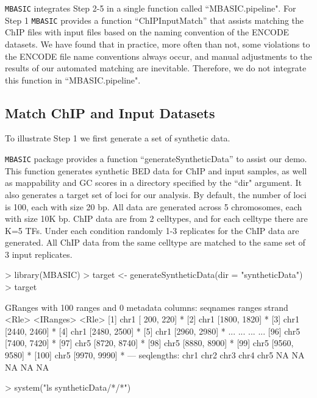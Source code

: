 \documentclass[a4paper,10pt]{article}
\begin{document}
\texttt{MBASIC} integrates Step 2-5 in a single function called ``MBASIC.pipeline". For Step 1 \texttt{MBASIC} provides a function ``ChIPInputMatch'' that assists matching the ChIP files with input files based on the naming convention of the ENCODE datasets. We have found that in practice, more often than not, some violations to the ENCODE file name conventions always occur, and manual adjustments to the results of our automated matching are inevitable. Therefore, we do not integrate this function in ``MBASIC.pipeline".

\subsection{Match ChIP and Input Datasets}


To illustrate Step 1 we first generate a set of synthetic data.

\texttt{MBASIC} package provides a function ``generateSyntheticData'' to assist our demo. This function generates synthetic BED data for ChIP and input samples, as well as mappability and GC scores in a directory specified by the ``dir" argument. It also generates a target set of loci for our analysis. By default, the number of loci is 100, each with size 20 bp. All data are generated across 5 chromosomes, each with size 10K bp. ChIP data are from 2 celltypes, and for each celltype there are K=5 TFs. Under each condition randomly 1-3 replicates for the ChIP data are generated. All ChIP data from the same celltype are matched to the same set of 3 input replicates.

\begin{Schunk}
\begin{Sinput}
> library(MBASIC)
> target <- generateSyntheticData(dir = "syntheticData")
> target
\end{Sinput}
\begin{Soutput}
GRanges with 100 ranges and 0 metadata columns:
        seqnames       ranges strand
           <Rle>    <IRanges>  <Rle>
    [1]     chr1 [ 200,  220]      *
    [2]     chr1 [1800, 1820]      *
    [3]     chr1 [2440, 2460]      *
    [4]     chr1 [2480, 2500]      *
    [5]     chr1 [2960, 2980]      *
    ...      ...          ...    ...
   [96]     chr5 [7400, 7420]      *
   [97]     chr5 [8720, 8740]      *
   [98]     chr5 [8880, 8900]      *
   [99]     chr5 [9560, 9580]      *
  [100]     chr5 [9970, 9990]      *
  ---
  seqlengths:
   chr1 chr2 chr3 chr4 chr5
     NA   NA   NA   NA   NA
\end{Soutput}
\begin{Sinput}
> system("ls syntheticData/*/*")
\end{Sinput}
\end{Schunk}
\end{document}
